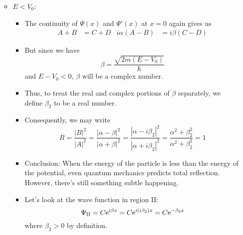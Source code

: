 \documentclass[../notes.tex]{subfiles}
\begin{document}
\begin{itemize}
\begin{itemize}
\begin{itemize}
\begin{equation*}
            \end{equation*}
        \end{itemize}
        \item $E<V_0$:
        \begin{itemize}
            \item The continuity of $\Psi(x)$ and $\Psi'(x)$ at $x=0$ again gives us
            \begin{align*}
                A+B &= C+D&
                i\alpha(A-B) &= i\beta(C-D)
            \end{align*}
            \item But since we have
            \begin{equation*}
                \beta = \frac{\sqrt{2m(E-V_0)}}{\hbar}
            \end{equation*}
            and $E-V_0<0$, $\beta$ will be a complex number.
            \item Thus, to treat the real and complex portions of $\beta$ separately, we define $\beta_2$ to be a real number.
            \item Consequently, we may write
            \begin{equation*}
                R = \frac{|B|^2}{|A|^2} = \frac{|\alpha-\beta|^2}{|\alpha+\beta|^2} = \frac{|\alpha-i\beta_2|^2}{|\alpha+i\beta_2|^2} = \frac{\alpha^2+\beta_2^2}{\alpha^2+\beta_2^2} = 1
            \end{equation*}
            \item Conclusion: When the energy of the particle is less than the energy of the potential, even quantum mechanics predicts total reflection. However, there's still something subtle happening.
            \item Let's look at the wave function in region II:
            \begin{equation*}
                \Psi_\text{II} = C\e[i\beta x] = C\e[i(i\beta_2)x] = C\e[-\beta_2x]
            \end{equation*}
            where $\beta_2>0$ by definition.
            \begin{figure}[H]
                \centering
\end{figure}
\end{itemize}
\end{itemize}
\end{itemize}
\end{document}
